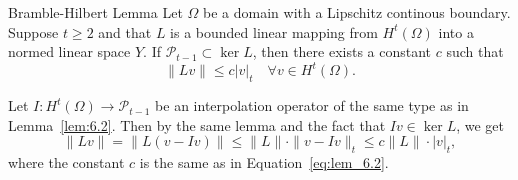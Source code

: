 \begin{lem}{Bramble-Hilbert Lemma}
    Let $\Omega$ be a domain with a Lipschitz continous boundary. Suppose $t\geq 2$ and that $L$ is a bounded linear mapping from $H^t(\Omega)$ into a normed linear space $Y$.
    If $\mathcal{P}_{t-1}\subset \ker L$, then there exists a constant $c$ such that~\label{lem:Bramble-Hilbert}
    \begin{equation}
        \|Lv\|\leq c|v|_t\quad \forall v\in H^t(\Omega).
    \end{equation}
\end{lem}
\begin{bev}
    Let $I:H^t(\Omega)\rightarrow \mathcal{P}_{t-1}$ be an interpolation operator of the same type as in Lemma~\ref{lem:6.2}.
     Then by the same lemma and the fact that $Iv\in\ker L$, we get
    \begin{equation}
        \|Lv\|=\|L(v-Iv)\|\leq \|L\|\cdot\|v-Iv\|_t\leq c\|L\| \cdot |v|_t,
    \end{equation}
    where the constant $c$  is the same as in Equation~\ref{eq:lem_6.2}.~\label{lem:6.3}
\end{bev}